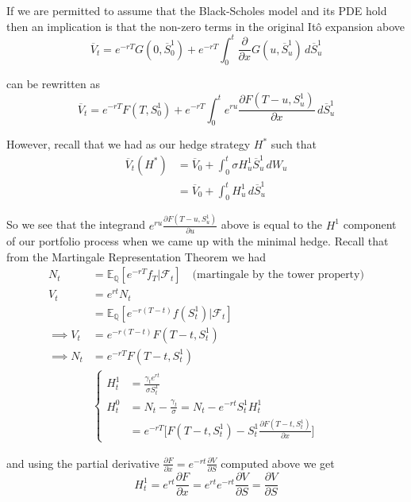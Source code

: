 \documentclass[12pt]{article}
\newlength\tindent
\renewcommand{\indent}{\hspace*{\tindent}}
\begin{document}
\indent If we are permitted to assume that the Black-Scholes model and its PDE hold then an implication is that the non-zero terms in the original It\^{o} expansion above
\begin{equation*}
	\overline{V}_t = e^{-rT}G(0,\overline{S}^1_0) + e^{-rT}\int^t_0 \frac{\partial}{\partial x} G(u,\overline{S}^1_u)\,d\overline{S}^1_u
\end{equation*}

can be rewritten as
\begin{equation*}
	\overline{V}_t = e^{-rT}F(T,S^1_0) + e^{-rT}\int^t_0 e^{ru}\frac{\partial F(T - u, S^1_u)}{\partial x}\,d\overline{S}^1_u 
\end{equation*}

However, recall that we had as our hedge strategy $H^*$ such that
\begin{align*}
	\overline{V}_t(H^*) &= \overline{V}_0 + \int^t_0\sigma H^1_u\overline{S}^1_u\,dW_u \\
	&= \overline{V}_0 + \int^t_0 H^1_u\,d\overline{S}^1_u
\end{align*}

\indent So we see that the integrand $e^{ru}\frac{\partial F(T - u, S^1_u)}{\partial u}$ above is equal to the $H^1$ component of our portfolio process when we came up with the minimal hedge. Recall that from the Martingale Representation Theorem we had
\begin{align*}
	N_t &= \mathbb E_{\mathbb Q}[e^{-rT} f_T | \mathcal F_t] \quad \text{(martingale by the tower property)} \\
	V_t &= e^{rt}N_t \\
	&= \mathbb E_{\mathbb Q}[e^{-r(T - t)} f(S^1_t) | \mathcal F_t] \\
	\implies V_t &= e^{-r(T - t)}F(T - t,S^1_t) \\
	\implies N_t &= e^{-rT}F(T - t,S^1_t) \\
	&\left\{
		\begin{array}{ll}
			H^1_t &= \frac{\gamma_te^{rt}}{\sigma S^1_t} \\
			H^0_t &= N_t - \frac{\gamma_t}{\sigma} = N_t - e^{-rt}S^1_tH^1_t \\
			&= e^{-rT}\bigg[F(T - t,S^1_t) - S^1_t\frac{\partial F(T - t,S^1_t)}{\partial x} \bigg]
		\end{array}
	\right.
\end{align*}

and using the partial derivative $\frac{\partial F}{\partial x} = e^{-rt}\frac{\partial V}{\partial S}$ computed above we get
\begin{equation*}
	H^1_t = e^{rt}\frac{\partial F}{\partial x} = e^{rt}e^{-rt}\frac{\partial V}{\partial S} = \frac{\partial V}{\partial S} 
\end{equation*}
\end{document}
